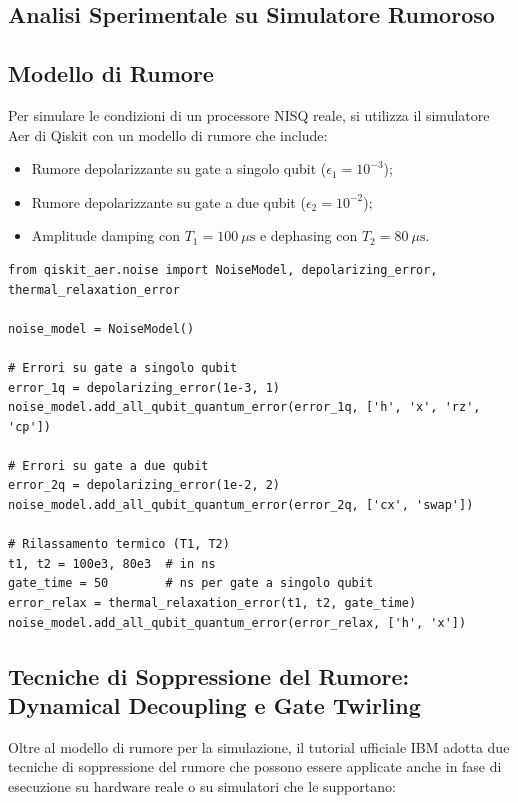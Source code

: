 \begin{onehalfspace}
\section{Analisi Sperimentale su Simulatore Rumoroso}

\subsection{Modello di Rumore}

Per simulare le condizioni di un processore NISQ reale, si utilizza il simulatore Aer di Qiskit con un modello di rumore che include:
\begin{itemize}
    \item Rumore depolarizzante su gate a singolo qubit ($\epsilon_1 = 10^{-3}$);
    \item Rumore depolarizzante su gate a due qubit ($\epsilon_2 = 10^{-2}$);
    \item Amplitude damping con $T_1 = 100\ \mu\text{s}$ e dephasing con $T_2 = 80\ \mu\text{s}$.
\end{itemize}

\begin{lstlisting}[caption={Configurazione del modello di rumore per Shor}]
from qiskit_aer.noise import NoiseModel, depolarizing_error, thermal_relaxation_error

noise_model = NoiseModel()

# Errori su gate a singolo qubit
error_1q = depolarizing_error(1e-3, 1)
noise_model.add_all_qubit_quantum_error(error_1q, ['h', 'x', 'rz', 'cp'])

# Errori su gate a due qubit
error_2q = depolarizing_error(1e-2, 2)
noise_model.add_all_qubit_quantum_error(error_2q, ['cx', 'swap'])

# Rilassamento termico (T1, T2)
t1, t2 = 100e3, 80e3  # in ns
gate_time = 50        # ns per gate a singolo qubit
error_relax = thermal_relaxation_error(t1, t2, gate_time)
noise_model.add_all_qubit_quantum_error(error_relax, ['h', 'x'])
\end{lstlisting}

\subsection{Tecniche di Soppressione del Rumore: Dynamical Decoupling e Gate Twirling}

Oltre al modello di rumore per la simulazione, il tutorial ufficiale IBM \cite{ibm_shor_tutorial} adotta due tecniche di soppressione del rumore che possono essere applicate anche in fase di esecuzione su hardware reale o su simulatori che le supportano:


\end{onehalfspace}
